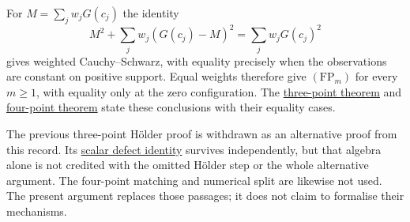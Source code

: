 For $M=\sum_jw_jG(c_j)$ the identity
\[
 M^2+\sum_jw_j(G(c_j)-M)^2=\sum_jw_jG(c_j)^2
\]
gives weighted Cauchy--Schwarz, with equality precisely when the observations
are constant on positive support. Equal weights therefore give
$(\mathrm{FP}_m)$ for every $m\ge1$, with equality only at the zero
configuration. The
\href{https://github.com/wcook04/plectis-erdos/blob/3f1a5e9b284b9c3348eebd549e24c2f3972606ae/ErdosProblems/Erdos1041/PaperWeightedCoverageR11.lean\#L138}{three-point theorem}
and
\href{https://github.com/wcook04/plectis-erdos/blob/3f1a5e9b284b9c3348eebd549e24c2f3972606ae/ErdosProblems/Erdos1041/PaperWeightedCoverageR11.lean\#L146}{four-point theorem}
state these conclusions with their equality cases.

The previous three-point H\"older proof is withdrawn as an alternative proof
from this record. Its
\href{https://github.com/wcook04/plectis-erdos/blob/3f1a5e9b284b9c3348eebd549e24c2f3972606ae/ErdosProblems/Erdos1041/ThreePointDefectR11.lean\#L16}{scalar defect identity}
survives independently, but that algebra alone is not credited with
the omitted H\"older step or the whole alternative argument. The four-point
matching and numerical split are likewise not used. The present argument
replaces those passages; it does not claim to formalise their mechanisms.

